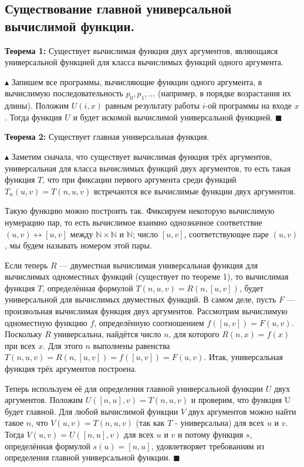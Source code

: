 \subsection{Существование главной универсальной вычислимой функции.}
\par \textbf{Теорема 1:} Существует вычислимая функция двух аргументов, являющаяся универсальной функцией для класса вычислимых функций одного аргумента.
\par $\blacktriangle$ Запишем все программы, вычисляющие функции одного аргумента, в вычислимую последовательность $p_0, p_1, \ldots$ (например, в порядке возрастания их длины). Положим $U(i, x)$ равным результату работы $i$-ой программы на входе $x$. Тогда функция $U$ и будет искомой вычислимой универсальной функцией. $\blacksquare$ 
\par \textbf{Теорема 2:} Существует главная универсальная функция.
\par $\blacktriangle$ Заметим сначала, что существует вычислимая функция трёх аргументов, универсальная для класса вычислимых функций двух аргументов, то есть такая функция $T$, что при фиксации первого аргумента среди функций $T_n(u, v) = T(n, u, v)$ встречаются все вычислимые функции двух аргументов.
\par Такую функцию можно построить так. Фиксируем некоторую вычислимую нумерацию пар, то есть вычислимое взаимно однозначное соответствие $(u, v) \leftrightarrow [u, v]$ между $\mathbb{N} \times \mathbb{N}$ и $\mathbb{N}$; число $[u, v]$, соответствующее паре $(u, v)$, мы будем называть номером этой пары.
\par Если теперь $R$ — двуместная вычислимая универсальная функция
для вычислимых одноместных функций (существует по теореме 1), то вычислимая функция $T$,
определённая формулой $T(n, u, v) = R(n, [u, v])$, будет универсальной для вычислимых двуместных функций. В самом деле, пусть $F$ —
произвольная вычислимая функция двух аргументов. Рассмотрим
вычислимую одноместную функцию $f$, определённую соотношением $f([u, v]) = F(u, v)$. Поскольку $R$ универсальна, найдётся число $n$,
для которого $R(n, x) = f(x)$ при всех $x$. Для этого $n$ выполнены равенства $T(n, u, v) = R(n, [u, v]) = f([u, v]) = F(u, v)$. Итак, универсальная функция
трёх аргументов построена.
\par Теперь используем её для определения главной универсальной
функции $U$ двух аргументов. Положим $U([n, u], v) = T(n, u, v)$ и проверим, что функция U будет главной. Для любой вычислимой функции $V$ двух аргументов можно найти такое $n$, что $V (u, v) = T(n, u, v)$ (так как $T$ - универсальна) для всех $u$ и $v$. Тогда $V (u, v) = U([n, u], v)$ для всех $u$ и $v$ и потому функция $s$, определённая формулой $s(u) = [n, u]$, удовлетворяет требованиям из
определения главной универсальной функции. $\blacksquare$